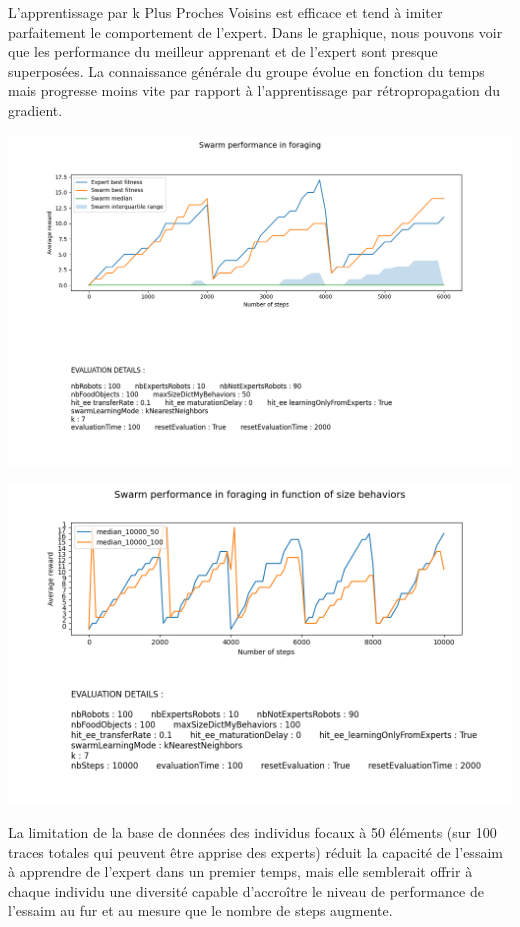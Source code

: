 \documentclass[a4paper, 12pt]{report}
\begin{document}
    L'apprentissage par k Plus Proches Voisins est efficace et tend à imiter parfaitement le comportement de l'expert.
    Dans le graphique, nous pouvons voir que les performance du meilleur apprenant et de l'expert sont presque superposées. La connaissance générale du groupe évolue en fonction du temps mais progresse moins vite par rapport à l'apprentissage par rétropropagation du gradient.
    
    \includegraphics[scale=0.5]{knn6000_50.png}
    
    \includegraphics[scale=0.5]{images/data_sizeDB_10000_knn.png}
    
    La limitation de la base de données des individus focaux à 50 éléments (sur 100 traces totales qui peuvent être apprise des experts) réduit la capacité de l'essaim à apprendre de l'expert dans un premier temps, mais elle semblerait offrir à chaque individu une diversité capable d'accroître le niveau de performance de l'essaim au fur et au mesure que le nombre de steps augmente. 
    
\end{document}
